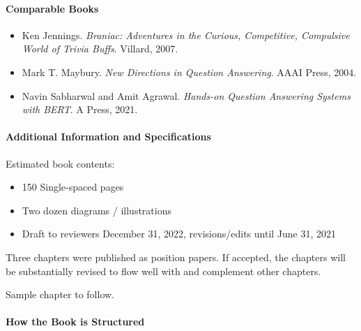 \paragraph{Comparable Books}

\begin{itemize}
        \item Ken Jennings.  \textit{Braniac: Adventures in the Curious,
        Competitive, Compulsive World of Trivia Buffs}.  Villard, 2007.

        \item Mark T. Maybury.  \textit{New Directions in Question
        Answering}.  AAAI Press, 2004.

        \item Navin Sabharwal and Amit Agrawal.  \textit{Hands-on Question
        Answering Systems with BERT}.  A Press, 2021.
\end{itemize}


\paragraph{Additional Information and Specifications}

Estimated book contents:
\begin{itemize}
  \item 150 Single-spaced pages
  \item Two dozen diagrams / illustrations
  \item Draft to reviewers December 31, 2022, revisions/edits until
    June 31, 2021
\end{itemize}

Three chapters were published as position papers.  If accepted, the
chapters will be substantially revised to flow well with and
complement other chapters.

Sample chapter to follow.

\paragraph{How the Book is Structured}



